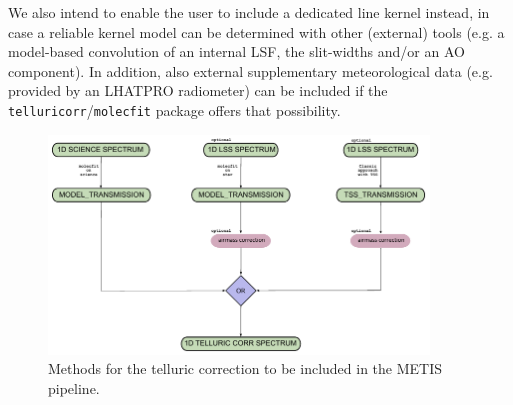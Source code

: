 {We also intend to enable the user to include a dedicated line kernel instead, in case a reliable kernel model can be determined with other (external) tools (e.g. a model-based convolution of an internal \ac{LSF}, the slit-widths and/or an \ac{AO} component). In addition, also external supplementary meteorological data (e.g. provided by an \ac{LHATPRO} radiometer) can be included if the \texttt{telluricorr}/\texttt{molecfit} package offers that possibility.
\begin{figure}[ht]
  \centering
  \includegraphics[width=0.9\textwidth]{figures/tell_corr_methods.pdf}
  \caption{Methods for the telluric correction to be included in the \ac{METIS} pipeline.}
  \label{Fig:tellcorrmethods}
\end{figure}
}
